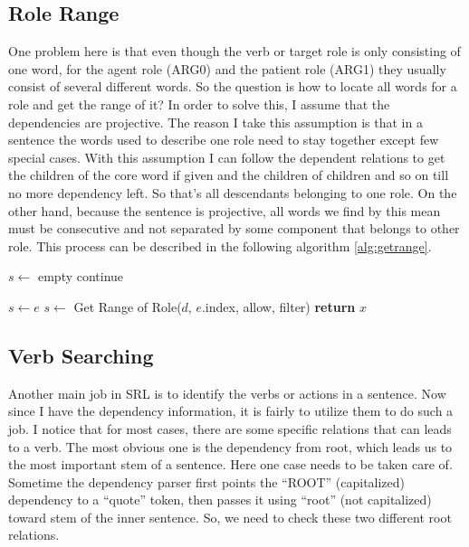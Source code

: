 \documentclass[letterpaper]{article}
\begin{document}
\subsection{Role Range}
One problem here is that even though the verb or target role is only consisting of one word, for the agent role (ARG0) and the patient role (ARG1) they usually consist of several different words. So the question is how to locate all words for a role and get the range of it? In order to solve this, I assume that the dependencies are projective. The reason I take this assumption is that in a sentence the words used to describe one role need to stay together except few special cases. With this assumption I can follow the dependent relations to get the children of the core word if given and the children of children and so on till no more dependency left. So that's all descendants belonging to one role. On the other hand, because the sentence is projective, all words we find by this mean must be consecutive and not separated by some component that belongs to other role. This process can be described in the following algorithm \ref{alg:getrange}.


\begin{algorithm}
	\caption{}\label{alg:getrange}
	\begin{algorithmic}[1]
		\State $s \gets $ empty 
		 
		\State continue
		\EndIf
		
		 
		\State $s \gets e$
		\State $s \gets$ Get Range of Role($d$, $e$.index, allow, filter)
		\EndIf	
		\EndIf
		\EndFor
		\State \textbf{return} $x$
		\EndProcedure
	\end{algorithmic}
\end{algorithm}


\subsection{Verb Searching}
Another main job in SRL is to identify the verbs or actions in a sentence. Now since I have the dependency information, it is fairly to utilize them to do such a job. I notice that for most cases, there are some specific relations that can leads to a verb. The most obvious one is the dependency from root, which leads us to the most important stem of a sentence. Here one case needs to be taken care of. Sometime the dependency parser first points the ``ROOT'' (capitalized) dependency to a ``quote'' token, then passes it using ``root'' (not capitalized) toward stem of the inner sentence. So, we need to check these two different root relations.\\
\end{document}
